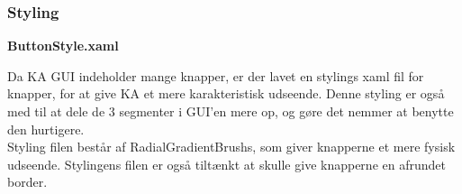 \subsubsection{Styling}

\textbf{ButtonStyle.xaml}

Da \gls{KA} \gls{GUI} indeholder mange knapper, er der lavet en stylings xaml fil for knapper, for at give \gls{KA} et mere karakteristisk udseende. Denne styling er også med til at dele de 3 segmenter i GUI'en mere op, og gøre det nemmer at benytte den hurtigere. \\
Styling filen består af RadialGradientBrushs, som giver knapperne et mere fysisk udseende. Stylingens filen er også tiltænkt at skulle give knapperne en afrundet border.
